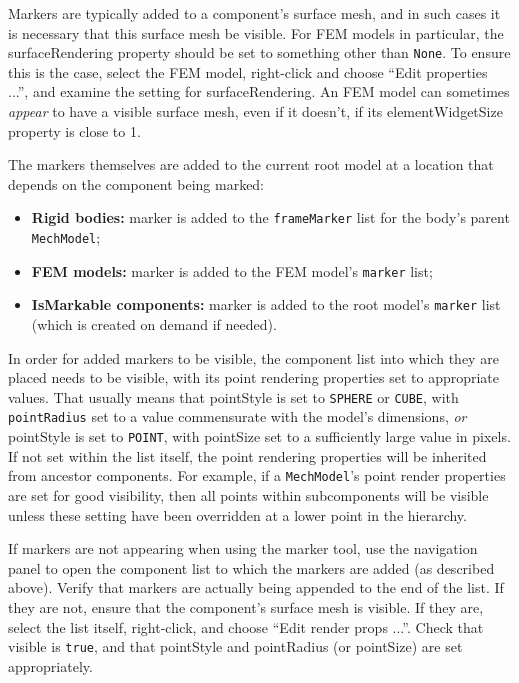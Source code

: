 \documentclass{article}
\begin{document}
\begin{sideblock}
Markers are typically added to a component's surface mesh, and in such
cases it is necessary that this surface mesh be visible. For FEM
models in particular, the {\sf surfaceRendering} property should be
set to something other than {\tt None}. To ensure this is the case,
select the FEM model, right-click and choose {\sf ``Edit properties
...''}, and examine the setting for {\sf surfaceRendering}. An FEM model
can sometimes {\it appear} to have a visible surface mesh, even if it
doesn't, if its {\sf elementWidgetSize} property is close to 1.
\end{sideblock}

The markers themselves are added to the current root model at a
location that depends on the component being marked:

\begin{itemize}
\item {\bf Rigid bodies:} marker is added to the {\tt frameMarker}
list for the body's parent {\tt MechModel};

\item {\bf FEM models:} marker is added to the FEM model's {\tt marker} list;

\item {\bf IsMarkable components:} marker is added to the root model's
{\tt marker} list (which is created on demand if needed).

\end{itemize}

In order for added markers to be visible, the component list into
which they are placed needs to be visible, with its point rendering
properties set to appropriate values. That usually means that {\sf
pointStyle} is set to {\tt SPHERE} or {\tt CUBE}, with {\tt
pointRadius} set to a value commensurate with the model's dimensions,
{\it or} {\sf pointStyle} is set to {\tt POINT}, with {\sf pointSize}
set to a sufficiently large value in pixels.  If not set within the
list itself, the point rendering properties will be inherited from
ancestor components. For example, if a {\tt MechModel}'s point render
properties are set for good visibility, then all points within
subcomponents will be visible unless these setting have been
overridden at a lower point in the hierarchy.

\begin{sideblock}
If markers are not appearing when using the marker tool, use the
navigation panel to open the component list to which the markers are
added (as described above). Verify that markers are actually being
appended to the end of the list. If they are not, ensure that the
component's surface mesh is visible. If they are, select the list
itself, right-click, and choose {\sf ``Edit render props ...''}. Check
that {\sf visible} is {\tt true}, and that {\sf pointStyle} and {\sf
pointRadius} (or {\sf pointSize}) are set appropriately.
\end{sideblock}
\end{document}
